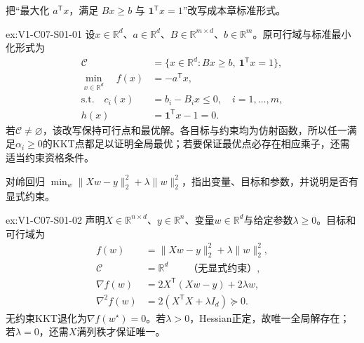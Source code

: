 \begin{SLChapterExercisePairSection}

\begin{exercise}\label{ex:V1-C07-S01-01}
把“最大化 $a^{\mathsf T}x$，满足 $Bx\ge b$ 与 $\mathbf1^{\mathsf T}x=1$”改写成本章标准形式。
\end{exercise}
\label{sol:V1-C07-S01-01}
\begin{chapterexercisesolution}{ex:V1-C07-S01-01}
设$x\in\mathbb R^d$、$a\in\mathbb R^d$、$B\in\mathbb R^{m\times d}$、$b\in\mathbb R^m$。原可行域与标准最小化形式为
\[
\begin{aligned}
\mathcal C
&=\{x\in\mathbb R^d:Bx\ge b,\ \mathbf1^{\mathsf T}x=1\},\\
\min_{x\in\mathbb R^d}\quad
f(x)&=-a^{\mathsf T}x,\\
\text{s.t.}\quad
c_i(x)&=b_i-B_i x\le0,\quad i=1,\ldots,m,\\
h(x)&=\mathbf1^{\mathsf T}x-1=0.
\end{aligned}
\]
若$\mathcal C\ne\varnothing$，该改写保持可行点和最优解。各目标与约束均为仿射函数，所以任一满足$\alpha_i\ge0$的KKT点都足以证明全局最优；若要保证最优点必存在相应乘子，还需适当约束资格条件。
\end{chapterexercisesolution}

\begin{exercise}\label{ex:V1-C07-S01-02}
对岭回归 $\min_w\|Xw-y\|_2^2+\lambda\|w\|_2^2$，指出变量、目标和参数，并说明是否有显式约束。
\end{exercise}
\label{sol:V1-C07-S01-02}
\begin{chapterexercisesolution}{ex:V1-C07-S01-02}
声明$X\in\mathbb R^{n\times d}$、$y\in\mathbb R^n$、变量$w\in\mathbb R^d$与给定参数$\lambda\ge0$。目标和可行域为
\[
\begin{aligned}
f(w)&=\|Xw-y\|_2^2+\lambda\|w\|_2^2,\\
\mathcal C&=\mathbb R^d\qquad\text{（无显式约束）},\\
\nabla f(w)&=2X^{\mathsf T}(Xw-y)+2\lambda w,\\
\nabla^2f(w)&=2(X^{\mathsf T}X+\lambda I_d)\succeq0.
\end{aligned}
\]
无约束KKT退化为$\nabla f(w^\star)=0$。若$\lambda>0$，Hessian正定，故唯一全局解存在；若$\lambda=0$，还需$X$满列秩才保证唯一。
\end{chapterexercisesolution}


\end{SLChapterExercisePairSection}
